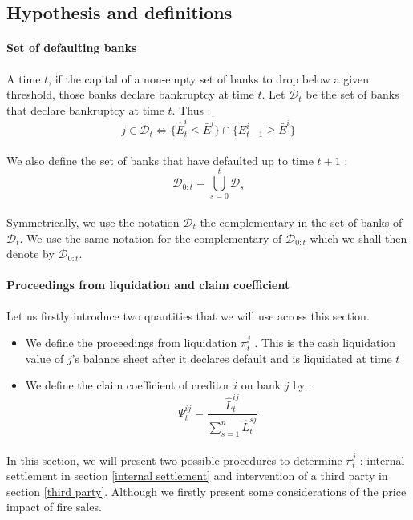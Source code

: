 \documentclass{article}
\newcommand{\wh}{\widehat}
\begin{document}
\subsection{Hypothesis and definitions}

\paragraph{Set of defaulting banks}
A time $t$, if the capital of a non-empty set of banks to drop below a given threshold, those banks declare bankruptcy at time $t$. Let $\mathcal{D}_t$ be the set of banks that declare bankruptcy at time $t$. Thus : $$j \in \mathcal{D}_{t} \Leftrightarrow \{ \widehat{E}_{t}^i \leq \bar{E}^i \} \cap \{ E_{t-1}^i \geq \bar{E}^i \} $$

\paragraph{}    
We also define the set of banks that have defaulted up to time $t+1$ :
$$\mathcal{D}_{0:t} = \bigcup_{s=0}^{t} \mathcal{D}_s $$

\paragraph{}
Symmetrically, we use the notation $\overline{\mathcal{D}_{t}}$ the complementary in the set of banks of $\mathcal{D}_{t}$. We use the same notation for the complementary of $\mathcal{D}_{0:t}$ which we shall then denote by $\overline{\mathcal{D}_{0:t}}$.


\paragraph{Proceedings from liquidation and claim coefficient}
Let us firstly introduce two quantities that we will use across this section. 

\begin{itemize}

\item We define the proceedings from liquidation $\pi_t^j$ . This is the cash liquidation value of $j$'s balance sheet after it declares default and is liquidated at time $t$
\item We define the claim coefficient of creditor $i$ on bank $j$ by :
$$\Psi_t^{ij} = \frac{\wh L_t^{ij}}{\sum_{s=1}^n \wh L_t^{sj}} $$

\end{itemize}

\paragraph{}
In this section, we will present two possible procedures to determine $\pi_t^j$ : internal settlement in section \ref{internal settlement} and intervention of a third party in section \ref{third party}. Although we firstly present some considerations of the price impact of fire sales.
\end{document}
